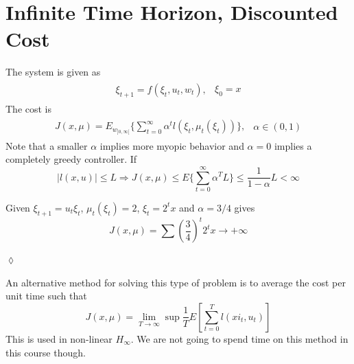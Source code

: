 \section{Infinite Time Horizon, Discounted Cost}
The system is given as
\begin{align*}
\begin{split}
\xi_{t+1} = f(\xi_t,u_t,w_t),
\end{split}
\begin{split}
\xi_0 = x
\end{split}
\end{align*}
The cost is
\begin{align*}
\begin{split}
J(x,\mu) = E_{w_{]0,\infty[}}\{\sum_{t=0}^\infty \alpha^tl(\xi_t,\mu_t(\xi_t))\},
\end{split}
\begin{split}
\alpha\in(0,1)
\end{split}
\end{align*}
Note that a smaller $\alpha$ implies more myopic behavior and $\alpha=0$ implies a completely greedy controller. If
$$|l(x,u)|\leq L \Rightarrow J(x,\mu)\leq E\{\sum_{t=0}^\infty \alpha^TL\}\leq \frac{1}{1-\alpha}L<\infty$$

\begin{example}
Given $\xi_{t+1}=u_t\xi_t$, $\mu_t(\xi_t)=2$, $\xi_t=2^tx$ and $\alpha=3/4$ gives
$$J(x,\mu) = \sum(\frac{3}{4})^t2^tx\to+\infty$$
\end{example}
$\lozenge$

An alternative method for solving this type of problem is to average the cost per unit time such that
$$J(x,\mu) = \lim_{T\to\infty}\sup \frac{1}{T}E[\sum_{t=0}^Tl(xi_t,u_t)]$$
This is used in non-linear $H_\infty$. We are not going to spend time on this method in this course though.

